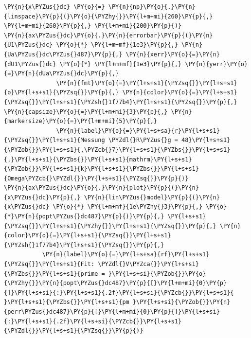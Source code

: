 \begin{tcolorbox}[breakable, size=fbox, boxrule=1pt, pad at break*=1mm,colback=cellbackground, colframe=cellborder]
\begin{Verbatim}[commandchars=\\\{\}]
\PY{n}{x\PYZus{}dc} \PY{o}{=} \PY{n}{np}\PY{o}{.}\PY{n}{linspace}\PY{p}{(}\PY{o}{\PYZhy{}}\PY{l+m+mi}{260}\PY{p}{,} \PY{l+m+mi}{260}\PY{p}{,} \PY{l+m+mi}{200}\PY{p}{)}
\PY{n}{ax\PYZus{}dc}\PY{o}{.}\PY{n}{errorbar}\PY{p}{(}\PY{n}{U1\PYZus{}dc} \PY{o}{*} \PY{l+m+mf}{1e3}\PY{p}{,} \PY{n}{Ua\PYZus{}dc\PYZus{}487}\PY{p}{,} \PY{n}{xerr}\PY{o}{=}\PY{n}{dU1\PYZus{}dc} \PY{o}{*} \PY{l+m+mf}{1e3}\PY{p}{,} \PY{n}{yerr}\PY{o}{=}\PY{n}{dUa\PYZus{}dc}\PY{p}{,}
               \PY{n}{fmt}\PY{o}{=}\PY{l+s+s1}{\PYZsq{}}\PY{l+s+s1}{o}\PY{l+s+s1}{\PYZsq{}}\PY{p}{,} \PY{n}{color}\PY{o}{=}\PY{l+s+s1}{\PYZsq{}}\PY{l+s+s1}{\PYZsh{}1f77b4}\PY{l+s+s1}{\PYZsq{}}\PY{p}{,} \PY{n}{capsize}\PY{o}{=}\PY{l+m+mi}{3}\PY{p}{,} \PY{n}{markersize}\PY{o}{=}\PY{l+m+mi}{5}\PY{p}{,}
               \PY{n}{label}\PY{o}{=}\PY{l+s+sa}{r}\PY{l+s+s1}{\PYZsq{}}\PY{l+s+s1}{Messung \PYZdl{}R\PYZus{}g = 48}\PY{l+s+s1}{\PYZob{}}\PY{l+s+s1}{,\PYZcb{}7}\PY{l+s+s1}{\PYZbs{}}\PY{l+s+s1}{,}\PY{l+s+s1}{\PYZbs{}}\PY{l+s+s1}{mathrm}\PY{l+s+s1}{\PYZob{}}\PY{l+s+s1}{k}\PY{l+s+s1}{\PYZbs{}}\PY{l+s+s1}{Omega\PYZcb{}\PYZdl{}}\PY{l+s+s1}{\PYZsq{}}\PY{p}{)}
\PY{n}{ax\PYZus{}dc}\PY{o}{.}\PY{n}{plot}\PY{p}{(}\PY{n}{x\PYZus{}dc}\PY{p}{,} \PY{n}{lin\PYZus{}model}\PY{p}{(}\PY{n}{x\PYZus{}dc} \PY{o}{*} \PY{l+m+mf}{1e\PYZhy{}3}\PY{p}{,} \PY{o}{*}\PY{n}{popt\PYZus{}dc487}\PY{p}{)}\PY{p}{,} \PY{l+s+s1}{\PYZsq{}}\PY{l+s+s1}{\PYZhy{}}\PY{l+s+s1}{\PYZsq{}}\PY{p}{,} \PY{n}{color}\PY{o}{=}\PY{l+s+s1}{\PYZsq{}}\PY{l+s+s1}{\PYZsh{}1f77b4}\PY{l+s+s1}{\PYZsq{}}\PY{p}{,}
           \PY{n}{label}\PY{o}{=}\PY{l+s+sa}{rf}\PY{l+s+s1}{\PYZsq{}}\PY{l+s+s1}{Fit: \PYZdl{}V\PYZca{}}\PY{l+s+s1}{\PYZbs{}}\PY{l+s+s1}{prime = }\PY{l+s+si}{\PYZob{}}\PY{o}{\PYZhy{}}\PY{n}{popt\PYZus{}dc487}\PY{p}{[}\PY{l+m+mi}{0}\PY{p}{]}\PY{l+s+si}{:}\PY{l+s+s1}{.2f}\PY{l+s+si}{\PYZcb{}}\PY{l+s+s1}{ }\PY{l+s+s1}{\PYZbs{}}\PY{l+s+s1}{pm }\PY{l+s+si}{\PYZob{}}\PY{n}{perr\PYZus{}dc487}\PY{p}{[}\PY{l+m+mi}{0}\PY{p}{]}\PY{l+s+si}{:}\PY{l+s+s1}{.2f}\PY{l+s+si}{\PYZcb{}}\PY{l+s+s1}{\PYZdl{}}\PY{l+s+s1}{\PYZsq{}}\PY{p}{)}


\end{Verbatim}
\end{tcolorbox}
